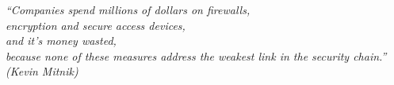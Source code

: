 \begin{epigrafe}
    \vspace*{\fill}
    \begin{flushright}

        \textit{“Companies spend millions of dollars on firewalls,\\ encryption and secure access devices,\\
        and it’s money wasted,\\ because none of these measures address the weakest link in the security chain.”\\
        (Kevin Mitnik)}
    \end{flushright}
\end{epigrafe}